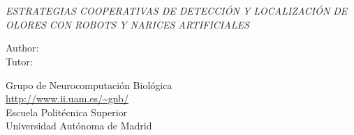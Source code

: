 \chapter*{}

\vspace*{-2cm}

\begin{center}

\large \MakeUppercase{\textbf{\titulo}}

\normalsize \MakeUppercase{\textit{Estrategias cooperativas de detecci\'on y localizaci\'on de olores con robots y narices artificiales}}

\vspace{2cm}

\Large Author: \textbf{\autor} \\
\Large Tutor: \textbf{\tutor} \\

\vspace{6cm}


Grupo de Neurocomputaci\'on Biol\'ogica \\
\url{http://www.ii.uam.es/~gnb/} \\
\vspace{0.1cm}
Escuela Polit\'ecnica Superior \\
Universidad Aut\'onoma de Madrid \\
\vspace{0.5cm}
\Large \fecha

\end{center}

\normalsize

\newpage \thispagestyle{empty} %
